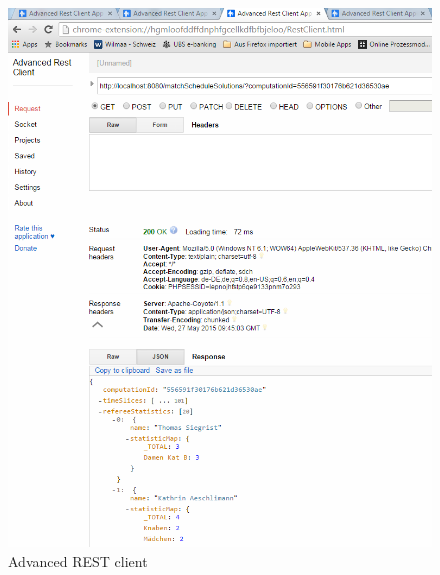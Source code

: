 \begin{figure}[h]
\centering
\includegraphics[scale=0.65]{images/advanced_rest_client.png}
\caption[Advanced REST client]{Advanced REST client \selfmade{}}
\label{fig:advanced_rest_client}
\end{figure}